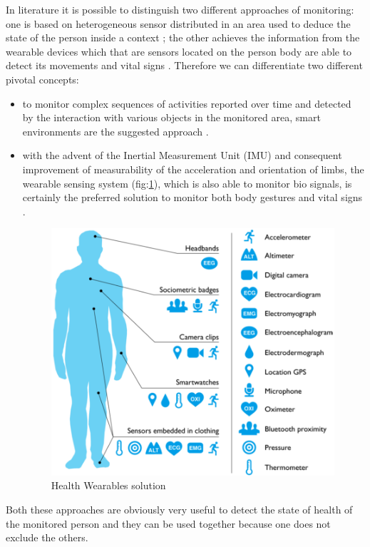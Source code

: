 \documentclass{thesisreport}
\begin{document}
 In literature it is possible to distinguish two different approaches of monitoring: one is based on heterogeneous sensor distributed in an area used to deduce the state of the person inside a context \cite{aggarwal2011human}; the other achieves the information from the wearable devices which that are sensors located on the person body are able to detect its movements and vital signs \cite{bao2004activity}. 
 Therefore we can differentiate two different pivotal concepts:
 \begin{itemize}
    \item to monitor complex sequences of activities reported over time and detected by the interaction with various objects in the monitored area, smart environments are the suggested approach \cite{scalmato2012describing}.
    \item with the advent of the Inertial Measurement Unit (IMU) and consequent improvement of measurability of the acceleration and orientation of limbs, the wearable sensing system (fig:\ref{fig:Wearables}), which is also able to monitor bio signals, is certainly the preferred solution to monitor both body gestures and vital signs \cite{bruno2013analysis}.
    
    \begin{figure}
		\centering
		\includegraphics[width=10.5cm]{Thesis/data/sensoring.png}
		\caption{Health Wearables solution \cite{Wearables2016rise}}
		\label{fig:Wearables}
	\end{figure}
    
\end{itemize}
 
 
 
Both these approaches are obviously very useful to detect the state of health of the monitored person and they can be used together because one does not exclude the others. 
\end{document}
